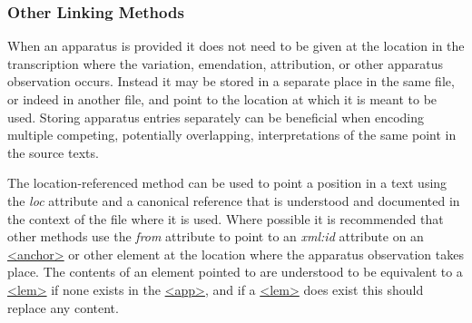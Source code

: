 \subsubsection[{Other Linking Methods}]{Other Linking Methods}\label{TCAPLN}\par
When an apparatus is provided it does not need to be given at the location in the transcription where the variation, emendation, attribution, or other apparatus observation occurs. Instead it may be stored in a separate place in the same file, or indeed in another file, and point to the location at which it is meant to be used. Storing apparatus entries separately can be beneficial when encoding multiple competing, potentially overlapping, interpretations of the same point in the source texts. \par
The location-referenced method can be used to point a position in a text using the {\itshape loc} attribute and a canonical reference that is understood and documented in the context of the file where it is used. Where possible it is recommended that other methods use the {\itshape from} attribute to point to an {\itshape xml:id} attribute on an \hyperref[TEI.anchor]{<anchor>} or other element at the location where the apparatus observation takes place. The contents of an element pointed to are understood to be equivalent to a \hyperref[TEI.lem]{<lem>} if none exists in the \hyperref[TEI.app]{<app>}, and if a \hyperref[TEI.lem]{<lem>} does exist this should replace any content.\par
